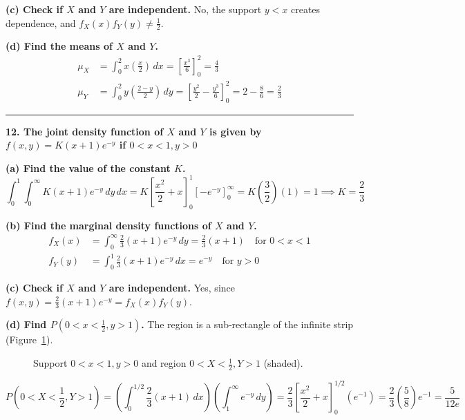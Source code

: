 \documentclass{article}
\begin{document}
\textbf{(c) Check if $X$ and $Y$ are independent.}
No, the support $y < x$ creates dependence, and $f_X(x)f_Y(y) \neq \frac{1}{2}$.

\textbf{(d) Find the means of $X$ and $Y$.}
\begin{align*}
\mu_X &= \int_{0}^{2} x\left(\frac{x}{2}\right) \,dx = \left[ \frac{x^3}{6} \right]_0^2 = \frac{4}{3} \\
\mu_Y &= \int_{0}^{2} y\left(\frac{2-y}{2}\right) \,dy = \left[ \frac{y^2}{2} - \frac{y^3}{6} \right]_0^2 = 2 - \frac{8}{6} = \frac{2}{3}
\end{align*}

\vspace{1em}
\hrule
\vspace{1em}

\textbf{12. The joint density function of $X$ and $Y$ is given by $f(x, y) = K(x+1)e^{-y}$ if $0 < x < 1, y > 0$}

\textbf{(a) Find the value of the constant $K$.}
$$\int_{0}^{1} \int_{0}^{\infty} K(x+1)e^{-y} \,dy \,dx = K \left[ \frac{x^2}{2} + x \right]_0^1 \left[ -e^{-y} \right]_0^\infty = K\left(\frac{3}{2}\right)(1) = 1 \implies K = \frac{2}{3}$$

\textbf{(b) Find the marginal density functions of $X$ and $Y$.}
\begin{align*}
f_X(x) &= \int_{0}^{\infty} \frac{2}{3}(x+1)e^{-y} \,dy = \frac{2}{3}(x+1) \quad \text{for } 0 < x < 1 \\
f_Y(y) &= \int_{0}^{1} \frac{2}{3}(x+1)e^{-y} \,dx = e^{-y} \quad \text{for } y > 0
\end{align*}

\textbf{(c) Check if $X$ and $Y$ are independent.}
Yes, since $f(x,y) = \frac{2}{3}(x+1)e^{-y} = f_X(x)f_Y(y)$.

\textbf{(d) Find $P(0 < x < \frac{1}{2}, y > 1)$.}
The region is a sub‑rectangle of the infinite strip (Figure~\ref{fig:12d}).
\begin{figure}[H]
\centering
{}
\caption{Support $0<x<1, y>0$ and region $0<X<\frac{1}{2}, Y>1$ (shaded).}
\label{fig:12d}
\end{figure}
$$P\left(0 < X < \frac{1}{2}, Y > 1\right) = \left( \int_{0}^{1/2} \frac{2}{3}(x+1) \,dx \right) \left( \int_{1}^{\infty} e^{-y} \,dy \right) = \frac{2}{3}\left[\frac{x^2}{2} + x\right]_0^{1/2} (e^{-1}) = \frac{2}{3}\left(\frac{5}{8}\right)e^{-1} = \frac{5}{12e}$$
\end{document}
